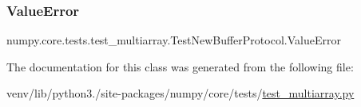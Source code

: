 \subsubsection{\texorpdfstring{Value\+Error}{ValueError}}
{\footnotesize\ttfamily numpy.\+core.\+tests.\+test\+\_\+multiarray.\+Test\+New\+Buffer\+Protocol.\+Value\+Error\hspace{0.3cm}{\ttfamily [static]}}



The documentation for this class was generated from the following file\+:\begin{DoxyCompactItemize}
\item 
venv/lib/python3./site-\/packages/numpy/core/tests/\hyperlink{core_2tests_2test__multiarray_8py}{test\+\_\+multiarray.\+py}\end{DoxyCompactItemize}
